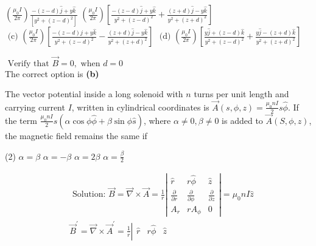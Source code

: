 \begin{enumerate}
\begin{tasks}
		\task[\textbf{A.}]$\left(\frac{\mu_{0} I}{2 \pi}\right) \frac{-(z-d) \hat{j}+y \hat{k}}{\left[y^{2}+(z-d)^{2}\right]}$
		\task[\textbf{B.}]$\left(\frac{\mu_{0} I}{2 \pi}\right)\left[\frac{-(z-d) \hat{j}+y \hat{k}}{y^{2}+(z-d)^{2}}+\frac{(z+d) \hat{j}-y \hat{k}}{y^{2}+(z+d)^{2}}\right]$
		\task[\textbf{C.}]$\text { (c) }\left(\frac{\mu_{0} I}{2 \pi}\right)\left[\frac{-(z-d) \hat{j}+y \hat{k}}{y^{2}+(z-d)^{2}}-\frac{(z+d) \hat{j}-y \hat{k}}{y^{2}+(z+d)^{2}}\right]$
		\task[\textbf{D.}]$\text { (d) }\left(\frac{\mu_{0} I}{2 \pi}\right)\left[\frac{y \hat{j}+(z-d) \hat{k}}{y^{2}+(z-d)^{2}}+\frac{y \hat{j}-(z+d) \hat{k}}{y^{2}+(z+d)^{2}}\right]$
	\end{tasks}
	\begin{answer}
		$\text { Verify that } \vec{B}=0, \text { when } d=0$\\
		The correct option is \textbf{(b)}	
	\end{answer}
	\begin{minipage}{\textwidth}
		\item The vector potential inside a long solenoid with $n$ turns per unit length and carrying current $I$, written in cylindrical coordinates is $\vec{A}(s, \phi, z)=\frac{\mu_{0} n I}{2} s \hat{\phi}$. If the term $\frac{\mu_{0} n I}{2} s(\alpha \cos \phi \hat{\phi}+\beta \sin \phi \hat{s})$, where $\alpha \neq 0, \beta \neq 0$ is added to $\vec{A}(S, \phi, z)$, the magnetic field remains the same if
	\end{minipage}
	\begin{tasks}(2)
		\task[\textbf{A.}]$\alpha=\beta$
		\task[\textbf{B.}]$\alpha=-\beta$
		\task[\textbf{C.}]$\alpha=2 \beta$
		\task[\textbf{D.}]$\alpha=\frac{\beta}{2}$
	\end{tasks}
	\begin{answer}
		\begin{align*}
		&\text { Solution: } \vec{B}=\vec{\nabla} \times \vec{A}=\frac{1}{r}\left|\begin{array}{ccc}
		\hat{r} & r \hat{\phi} & \hat{z} \\
		\frac{\partial}{\partial r} & \frac{\partial}{\partial \phi} & \frac{\partial}{\partial z} \\
		A_{r} & r A_{\phi} & 0
		\end{array}\right|=\mu_{0} n I \hat{z} \\
		&\vec{B}^{\prime}=\vec{\nabla} \times \vec{A}^{\prime}=\frac{1}{r}\left|\begin{array}{ccc}
		\hat{r} & r \hat{\phi} & \hat{z} \\

\end{array}
\end{align*}
\end{answer}
\end{enumerate}
